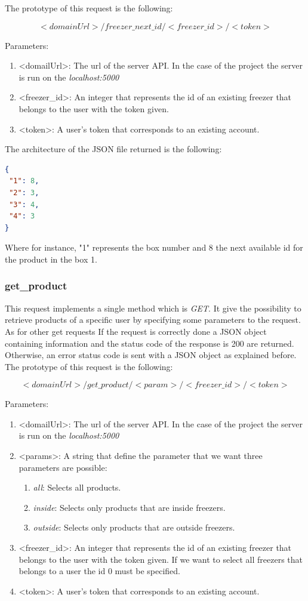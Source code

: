 The prototype of this request is the following:

$$<domainUrl>/freezer\_next\_id/<freezer\_id>/<token>$$

Parameters:
\begin{enumerate}
\item <domailUrl>: The url of the server API. In the case of the project the server is run on the \textit{localhost:5000}
\item <freezer\_id>: An integer that represents the id of an existing freezer that belongs to the user with the token given.
\item <token>: A user's token that corresponds to an existing account.
\end{enumerate}

The architecture of the JSON file returned is the following:
\begin{lstlisting}[language=json]
{
 "1": 8, 
 "2": 3, 
 "3": 4, 
 "4": 3
}
\end{lstlisting}
Where for instance, "1" represents the box number and 8 the next available id for the product in the box 1.

\subsubsection{get\_product}
This request implements a single method which is \textit{GET}. It give the possibility to retrieve products of a specific user by specifying some parameters to the request. As for other get requests If the request is correctly done a JSON object containing information and the status code of the response is 200 are returned. Otherwise, an error status code is sent with a JSON object as explained before.\\

The prototype of this request is the following:

$$<domainUrl>/get\_product/<param>/<freezer\_id>/<token>$$

Parameters:
\begin{enumerate}
\item <domailUrl>: The url of the server API. In the case of the project the server is run on the \textit{localhost:5000}
\item <params>: A string that define the parameter that we want three parameters are possible:
\begin{enumerate}
\item \textit{all}: Selects all products.
\item \textit{inside}: Selects only products that are inside freezers.
\item \textit{outside}: Selects only products that are outside freezers.
\end{enumerate}
\item <freezer\_id>: An integer that represents the id of an existing freezer that belongs to the user with the token given. If we want to select all freezers that belongs to a user the id 0 must be specified.
\item <token>: A user's token that corresponds to an existing account.
\end{enumerate}


